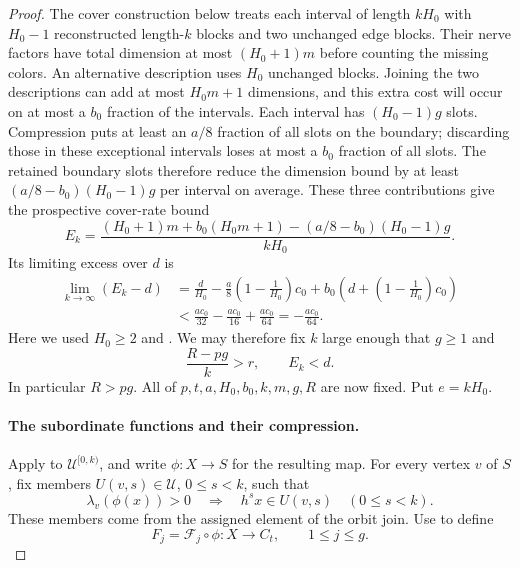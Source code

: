 \begin{proof}
The cover construction below treats each interval of length $kH_0$
with $H_0-1$ reconstructed length-$k$ blocks and two unchanged edge
blocks.  Their nerve factors have total dimension at most $(H_0+1)m$
before counting the missing colors.  An alternative description uses
$H_0$ unchanged blocks.  Joining the two descriptions can add at most
$H_0m+1$ dimensions, and this extra cost will occur on at most a
$b_0$ fraction of the intervals.  Each interval has $(H_0-1)g$ slots.
Compression puts at least an $a/8$ fraction of all slots on the boundary;
discarding those in these exceptional intervals loses at most a $b_0$
fraction of all slots.  The retained boundary slots therefore reduce the
dimension bound by at least $(a/8-b_0)(H_0-1)g$ per interval on average.
These three contributions give the prospective cover-rate bound
\begin{equation}
\label{eq:cover-rate-budget}
 E_k=
 \frac{(H_0+1)m+b_0(H_0m+1)
       -(a/8-b_0)(H_0-1)g}{kH_0}.
\end{equation}
Its limiting excess over $d$ is
\begin{align*}
 \lim_{k\to\infty}(E_k-d)
 &=\frac d{H_0}
   -\frac a8\left(1-\frac1{H_0}\right)c_0
   +b_0\left(d+\left(1-\frac1{H_0}\right)c_0\right)\\
 &<\frac{ac_0}{32}-\frac{ac_0}{16}
       +\frac{ac_0}{64}
   =-\frac{ac_0}{64}.
\end{align*}
Here we used $H_0\ge2$ and
.
We may therefore fix $k$ large enough that $g\ge1$ and
\begin{equation}
\label{eq:cover-final-parameters}
 \frac{R-pg}{k}>r,
 \qquad E_k<d.
\end{equation}
In particular $R>pg$.  All of $p,t,a,H_0,b_0,k,m,g,R$ are now
fixed.  Put $e=kH_0$.

\paragraph{The subordinate functions and their compression.}
Apply  to
$\mathcal U^{[0,k)}$, and write $\phi:X\to S$ for the resulting
map.  For every vertex $v$ of $S$, fix members
$U(v,s)\in\mathcal U$, $0\le s<k$, such that
\begin{equation}
\label{eq:time-vertex-subordination}
 \lambda_v(\phi(x))>0
 \quad\Longrightarrow\quad
 h^s x\in U(v,s)\quad(0\le s<k).
\end{equation}
These members come from the assigned element of the orbit join.
Use  to define
\[
 F_j=\mathcal F_j\circ\phi:X\longrightarrow C_t,
 \qquad 1\le j\le g.
\]


\end{proof}
